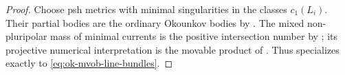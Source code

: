 \begin{proof}
Choose psh metrics with minimal singularities in the classes \(c_1(L_i)\).
Their partial bodies are the ordinary Okounkov bodies by
.  The mixed non-pluripolar mass of
minimal currents is the positive intersection number by
\cite[Definition~1.17]{BEGZ10}; its projective numerical interpretation is
the movable product of \cite[Propositions~2.12--2.13]{BFJ09}.
Thus  specializes exactly to
\eqref{eq:ok-mvob-line-bundles}.
\end{proof}
